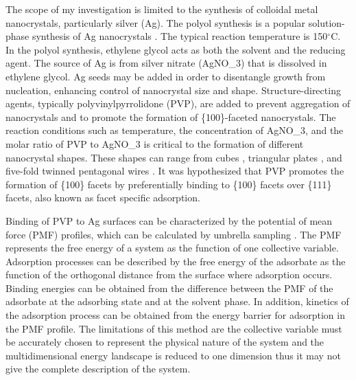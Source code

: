
The scope of my investigation is limited to the synthesis of colloidal metal nanocrystals, particularly silver (Ag).
The polyol synthesis is a popular solution-phase synthesis of Ag nanocrystals \cite{Skrabalak_2007}.
The typical reaction temperature is 150$^{\circ}$C.
In the polyol synthesis, ethylene glycol acts as both the solvent and the reducing agent.
The source of Ag is from silver nitrate (AgNO_3) that is dissolved in ethylene glycol.
Ag seeds may be added in order to disentangle growth from nucleation, enhancing control of nanocrystal size and shape.
Structure-directing agents, typically polyvinylpyrrolidone (PVP), are added to prevent aggregation of nanocrystals and to promote the formation of \{100\}-faceted nanocrystals.
The reaction conditions such as temperature, the concentration of AgNO_3, and the molar ratio of PVP to AgNO_3 is critical to the formation of different nanocrystal shapes.
These shapes can range from cubes \cite{Xia_2012,Zhang_2010}, triangular plates \cite{Lofton_2005,Liu_2012}, and five-fold twinned pentagonal wires \cite{Zhu_2011,Zhang_2008,Sun_2002}.
It was hypothesized that PVP promotes the formation of \{100\} facets by preferentially binding to \{100\} facets over \{111\} facets\cite{Xia_2012,Sun_2002}, also known as facet specific adsorption.

Binding of PVP to Ag surfaces can be characterized by the potential of mean force (PMF) profiles, which can be calculated by umbrella sampling \cite{Torrie_1977,K_stner_2011}.
The PMF represents the free energy of a system as the function of one collective variable.
Adsorption processes can be described by the free energy of the adsorbate as the function of the orthogonal distance from the surface where adsorption occurs.
Binding energies can be obtained from the difference between the PMF of the adsorbate at the adsorbing state and at the solvent phase.
In addition, kinetics of the adsorption process can be obtained from the energy barrier for adsorption in the PMF profile.
The limitations of this method are the collective variable must be accurately chosen to represent the physical nature of the system and the multidimensional energy landscape is reduced to one dimension thus it may not give the complete description of the system.
  
  
  
  
  
  
  
  
  
  
  